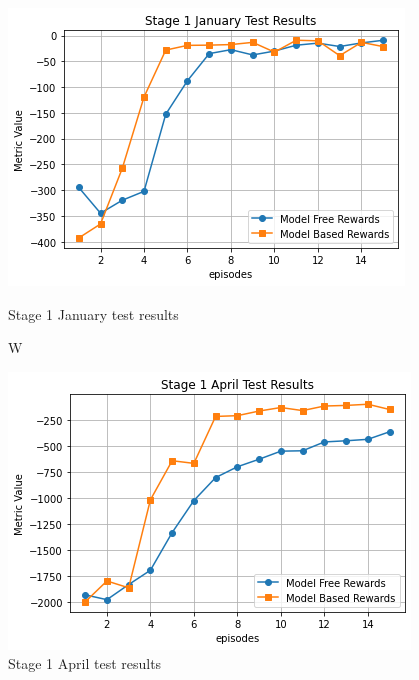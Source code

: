 \documentclass{article}
\begin{document}
\begin{figure}[H]
  \centering
  \begin{minipage}[t]{0.48\textwidth}
    \centering
    \includegraphics[width=\textwidth]{ExperimentResults/Stage_1_Jan_Test_Results.png}
    \caption{Stage 1 January test results}
    \label{fig:stage1-jan}
  \end{minipage}W
  \hfill
  \begin{minipage}[t]{0.48\textwidth}
    \centering
    \includegraphics[width=\textwidth]{ExperimentResults/Stage_1_April_Test_Results.png}
    \caption{Stage 1 April test results}
    \label{fig:stage1-april}
  \end{minipage}


\end{figure}
\end{document}
